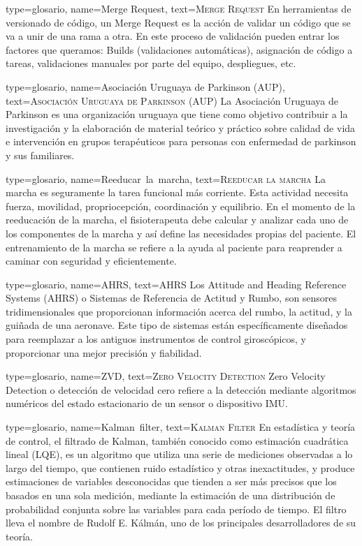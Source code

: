 {
type={glosario},
name={Merge Request},
text={\textsc{Merge Request}}
}
{ En herramientas de versionado de código, un Merge Request es la acción de validar un código que se va a unir de una rama a otra. En este proceso de validación pueden entrar los factores que queramos: Builds (validaciones automáticas), asignación de código a tareas, validaciones manuales por parte del equipo, despliegues, etc.
}

{
type={glosario},
name={Asociaci\'on Uruguaya de Parkinson (AUP)},
text={\textsc{Asociaci\'on Uruguaya de Parkinson (AUP)}}
}
{ La Asociación Uruguaya de Parkinson es una organización uruguaya que tiene como objetivo contribuir a la investigación y la elaboración de material teórico y práctico sobre calidad de vida e intervención en grupos terapéuticos para personas con enfermedad de parkinson  y sus familiares. 
}

{
type={glosario},
name={Reeducar~la~marcha},
text={\textsc{Reeducar la marcha}}
}
{
La marcha es seguramente la tarea funcional más corriente. Esta actividad necesita fuerza, movilidad, propriocepción, coordinación y equilibrio. En el momento de la reeducación de la marcha, el fisioterapeuta debe calcular y analizar cada uno de los componentes de la marcha y así define las necesidades propias del paciente. El entrenamiento de la marcha se refiere a la ayuda al paciente para reaprender a caminar con seguridad y eficientemente. 
}

{
type={glosario},
name={AHRS},
text={\textsc{AHRS}}
}
{
Los Attitude and Heading Reference Systems (AHRS) o Sistemas de Referencia de Actitud y Rumbo, son sensores tridimensionales que proporcionan información acerca del rumbo, la actitud, y la guiñada de una aeronave. Este tipo de sistemas están específicamente diseñados para reemplazar a los antiguos instrumentos de control giroscópicos, y proporcionar una mejor precisión y fiabilidad.
}

{
type={glosario},
name={ZVD},
text={\textsc{Zero Velocity Detection}}
}
{ Zero Velocity Detection o detección de velocidad cero refiere a la detección mediante algoritmos numéricos del estado estacionario de un sensor o dispositivo IMU. 
}

{
type={glosario},
name={Kalman~filter},
text={\textsc{Kalman Filter}}
}
{En estadística y teoría de control, el filtrado de Kalman, también conocido como estimación cuadrática lineal (LQE), es un algoritmo que utiliza una serie de mediciones observadas a lo largo del tiempo, que contienen ruido estadístico y otras inexactitudes, y produce estimaciones de variables desconocidas que tienden a ser más precisos que los basados en una sola medición, mediante la estimación de una distribución de probabilidad conjunta sobre las variables para cada período de tiempo. El filtro lleva el nombre de Rudolf E. Kálmán, uno de los principales desarrolladores de su teoría.}


